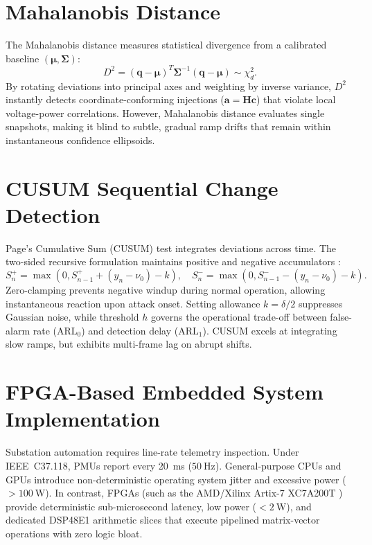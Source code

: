 \documentclass[11pt,a4paper]{report}
\begin{document}
\section{Mahalanobis Distance}
The Mahalanobis distance \cite{mahalanobis1936} measures statistical divergence from a calibrated
baseline $(\boldsymbol{\mu}, \boldsymbol{\Sigma})$:
\begin{equation}
D^2 = (\boldsymbol{q} - \boldsymbol{\mu})^T \boldsymbol{\Sigma}^{-1} (\boldsymbol{q} - \boldsymbol{\mu}) \sim \chi^2_d.
\end{equation}
By rotating deviations into principal axes and weighting by inverse variance, $D^2$ instantly
detects coordinate-conforming injections ($\boldsymbol{a} = \boldsymbol{H}\boldsymbol{c}$) that
violate local voltage-power correlations. However, Mahalanobis distance evaluates single snapshots,
making it blind to subtle, gradual ramp drifts that remain within instantaneous confidence ellipsoids.

\section{CUSUM Sequential Change Detection}
Page's Cumulative Sum (CUSUM) test \cite{page1954} integrates deviations across time. The two-sided
recursive formulation maintains positive and negative accumulators \cite{montgomery2019,huang2016}:
\begin{equation}
S_n^+ = \max(0, S_{n-1}^+ + (y_n - \nu_0) - k), \quad S_n^- = \max(0, S_{n-1}^- - (y_n - \nu_0) - k).
\end{equation}
Zero-clamping prevents negative windup during normal operation, allowing instantaneous reaction upon
attack onset. Setting allowance $k = \delta/2$ suppresses Gaussian noise, while threshold $h$
governs the operational trade-off between false-alarm rate ($\text{ARL}_0$) and detection delay ($\text{ARL}_1$).
CUSUM excels at integrating slow ramps, but exhibits multi-frame lag on abrupt shifts.

\section{FPGA-Based Embedded System Implementation}
Substation automation requires line-rate telemetry inspection. Under IEEE~C37.118, PMUs report every
20~ms ($50~\text{Hz}$). General-purpose CPUs and GPUs introduce non-deterministic operating system
jitter and excessive power ($> 100~\text{W}$). In contrast, FPGAs (such as the AMD/Xilinx Artix-7
XC7A200T \cite{artix7ds}) provide deterministic sub-microsecond latency, low power ($< 2~\text{W}$),
and dedicated DSP48E1 arithmetic slices that execute pipelined matrix-vector operations with zero logic bloat.
\end{document}
